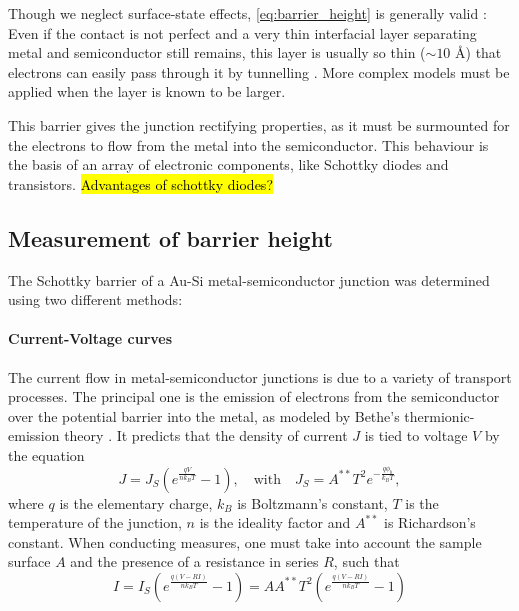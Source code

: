 Though we neglect surface-state effects, \autoref{eq:barrier_height} is generally valid \cite{sze_physics_2007}:
Even if the contact is not perfect and a very thin interfacial layer separating metal and semiconductor still remains, this layer is usually so thin ($\sim 10$ \AA) that electrons can easily pass through it by tunnelling \cite{rhoderick_physics_1970}.
More complex models must be applied when the layer is known to be larger.

This barrier gives the junction rectifying properties, as it must be surmounted for the electrons to flow from the metal into the semiconductor.
This behaviour is the basis of an array of electronic components, like Schottky diodes and transistors.
\hl{Advantages of schottky diodes?}

\subsection{Measurement of barrier height}
The Schottky barrier of a Au-Si metal-semiconductor junction was determined using two different methods:

\paragraph{Current-Voltage curves}
The current flow in metal-semiconductor junctions is due to a variety of transport processes.
The principal one is the emission of electrons from the semiconductor over the potential barrier into the metal, as modeled by Bethe's thermionic-emission theory \cite{sze_physics_2007}.
It predicts that the density of current $J$ is tied to voltage $V$ by the equation
\begin{equation} \label{eq:thermionic_emission_current}
    J = J_S \left( e^{\frac{qV}{n k_B T}} - 1 \right), \quad \text{{with}} \quad J_S = A^{**} T^2 e^{-\frac{q \phi_b}{k_B T}},
\end{equation}
where $q$ is the elementary charge, $k_B$ is Boltzmann's constant, $T$ is the temperature of the junction, $n$ is the ideality factor and $A^{**}$ is Richardson's constant.
When conducting measures, one must take into account the sample surface $A$ and the presence of a resistance in series $R$, such that
\begin{equation} \label{eq:iv_curve}
    I = I_S \left( e^{\frac{q (V- RI)}{n k_B T}} - 1\right) = A A^{**} T^2 \left( e^{\frac{q (V- RI)}{n k_B T}} - 1\right)
\end{equation}



